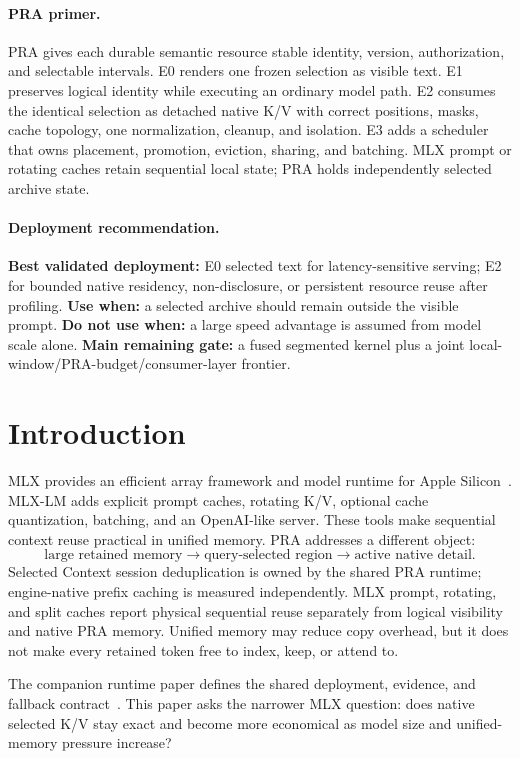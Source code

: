 \documentclass[10pt]{article}
\begin{document}
\paragraph{PRA primer.}
PRA gives each durable semantic resource stable identity, version, authorization,
and selectable intervals. E0 renders one frozen selection as visible text. E1
preserves logical identity while executing an ordinary model path. E2 consumes
the identical selection as detached native K/V with correct positions, masks,
cache topology, one normalization, cleanup, and isolation. E3 adds a scheduler
that owns placement, promotion, eviction, sharing, and batching. MLX prompt or
rotating caches retain sequential local state; PRA holds independently selected
archive state.

\paragraph{Deployment recommendation.}
\textbf{Best validated deployment:} E0 selected text for latency-sensitive
serving; E2 for bounded native residency, non-disclosure, or persistent resource
reuse after profiling. \textbf{Use when:} a selected archive should remain
outside the visible prompt. \textbf{Do not use when:} a large speed advantage is
assumed from model scale alone. \textbf{Main remaining gate:} a fused
segmented kernel plus a joint local-window/PRA-budget/consumer-layer frontier.

\section{Introduction}
MLX provides an efficient array framework and model runtime for Apple
Silicon~\cite{hannun2023mlx}. MLX-LM adds explicit prompt caches, rotating K/V,
optional cache quantization, batching, and an OpenAI-like server. These tools
make sequential context reuse practical in unified memory. PRA addresses a
different object:
\[
  \text{large retained memory}
  \rightarrow \text{query-selected region}
  \rightarrow \text{active native detail}.
\]
Selected Context session deduplication is owned by the shared PRA runtime;
engine-native prefix caching is measured independently. MLX prompt, rotating,
and split caches report physical sequential reuse separately from logical
visibility and native PRA memory.
Unified memory may reduce copy overhead, but it does not make every retained
token free to index, keep, or attend to.

The companion runtime paper defines the shared deployment, evidence, and
fallback contract~\cite{praruntime}. This paper asks the narrower MLX question:
does native selected K/V stay exact and become more economical as model size
and unified-memory pressure increase?
\end{document}
